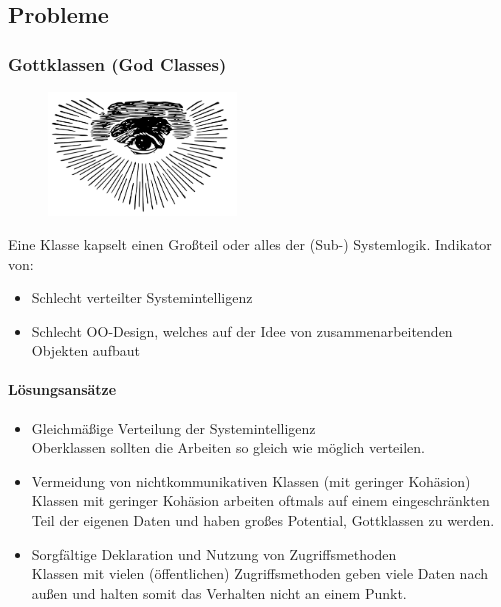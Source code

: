 \documentclass[
    ngerman,
    color=3b,
    summary,
    boxarc,
    main,
]{rubos-tuda-template}
\begin{document}
\subsection{Probleme}
\subsubsection{Gottklassen (God Classes)}%
\begin{figure}%
    \vspace*{-5mm}
    \includegraphics[width=5cm]{bilder/Godclass.pdf}
\end{figure}
Eine Klasse kapselt einen Großteil oder alles der (Sub-) Systemlogik. Indikator von:
\begin{itemize}
    \item Schlecht verteilter Systemintelligenz
    \item Schlecht OO-Design, welches auf der Idee von zusammenarbeitenden Objekten aufbaut
\end{itemize}

\paragraph{Lösungsansätze}\mbox{}\par
\begin{itemize}
    \item Gleichmäßige Verteilung der Systemintelligenz \\
          Oberklassen sollten die Arbeiten so gleich wie möglich verteilen.
    \item Vermeidung von nichtkommunikativen Klassen (mit geringer Kohäsion) \\
          Klassen mit geringer Kohäsion arbeiten oftmals auf einem eingeschränkten Teil der eigenen Daten und haben großes Potential, Gottklassen zu werden.
    \item Sorgfältige Deklaration und Nutzung von Zugriffsmethoden \\
          Klassen mit vielen (öffentlichen) Zugriffsmethoden geben viele Daten nach außen und halten somit das Verhalten nicht an einem Punkt.
\end{itemize}
\end{document}

